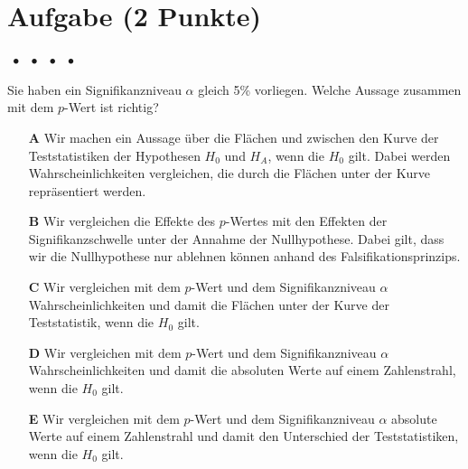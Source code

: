 \documentclass[a4paper, 9pt]{scrartcl}\usepackage[]{graphicx}\usepackage[]{xcolor}
\begin{document}

\section{Aufgabe \hfill (2 Punkte)}

\ifcollection
\begin{flushright}
\tiny\vspace{-2Ex}
\textbf{\examinhaltstart}
\exammodulemathstat $\;\bullet$
\exammodulestat $\;\bullet$
\exammodulestatbbv $\;\bullet$
\exammodulestatversuch $\;\bullet$
\exammodulebiostat
\vspace{-1Ex}
\end{flushright}
\fi




Sie haben ein Signifikanzniveau $\alpha$ gleich 5\% vorliegen. Welche Aussage zusammen mit dem $p$-Wert ist richtig?



\begin{enumerate}
\item [\textbf{A} \msquare] Wir machen ein Aussage über die Flächen und zwischen den Kurve der Teststatistiken der Hypothesen $H_0$ und $H_A$, wenn die $H_0$ gilt. Dabei werden Wahrscheinlichkeiten vergleichen, die durch die Flächen unter der Kurve repräsentiert werden.
\item [\textbf{B} \msquare] Wir vergleichen die Effekte des $p$-Wertes mit den Effekten der Signifikanzschwelle unter der Annahme der Nullhypothese. Dabei gilt, dass wir die Nullhypothese nur ablehnen können anhand des Falsifikationsprinzips.
\item [\textbf{C} \msquare] Wir vergleichen mit dem $p$-Wert und dem Signifikanzniveau $\alpha$ Wahrscheinlichkeiten und damit die Flächen unter der Kurve der Teststatistik, wenn die $H_0$ gilt.
\item [\textbf{D} \msquare] Wir vergleichen mit dem $p$-Wert und dem Signifikanzniveau $\alpha$ Wahrscheinlichkeiten und damit die absoluten Werte auf einem Zahlenstrahl, wenn die $H_0$ gilt.
\item [\textbf{E} \msquare] Wir vergleichen mit dem $p$-Wert und dem Signifikanzniveau $\alpha$ absolute Werte auf einem Zahlenstrahl und damit den Unterschied der Teststatistiken, wenn die $H_0$ gilt.
\end{enumerate}
\end{document}
